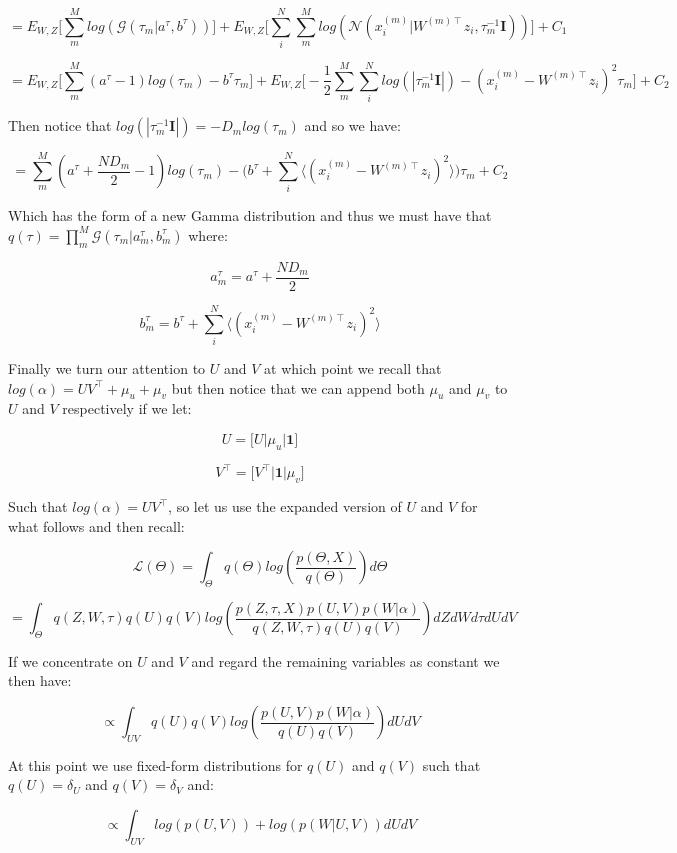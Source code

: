 \documentclass{article}
\begin{document}
$$ = E_{W,Z}\bigg[\sum_m^M{log(\mathcal{G}(\tau_m|a^\tau,b^\tau))}\bigg] +  E_{W,Z}\bigg[\sum_i^N{\sum_m^M{log(\mathcal{N}(x_i^{(m)}|W^{(m)\intercal}z_i, \tau_m^{-1}\textbf{I}))}}\bigg]+C_1$$

$$ = E_{W,Z}\bigg[\sum_m^M{(a^\tau-1)log(\tau_m) - b^\tau\tau_m}\bigg] + E_{W,Z}\bigg[-\frac{1}{2}\sum_m^M{\sum_i^N{log(|\tau_m^{-1}\textbf{I}|) - (x_i^{(m)}-W^{(m)\intercal}z_i)^2\tau_m}}\bigg]+C_2$$

Then notice that $log(|\tau_m^{-1}\textbf{I}|) =  -D_mlog(\tau_m)$ and so we have:

$$ = \sum_m^M{(a^\tau + \frac{ND_m}{2} - 1)log(\tau_m) - \bigg(b^\tau + \sum_i^N{\bigg\langle(x_i^{(m)}-W^{(m)\intercal}z_i)^2\bigg\rangle}\bigg)\tau_m}+C_2$$

Which has the form of a new Gamma distribution and thus we must have that $q(\tau) = \prod_m^M{\mathcal{G}(\tau_m|a_m^\tau,b_m^\tau)}$ where:

$$a_m^\tau = a^\tau + \frac{ND_m}{2}$$

$$b_m^\tau = b^\tau + \sum_i^N{\bigg\langle(x_i^{(m)}-W^{(m)\intercal}z_i)^2\bigg\rangle}$$

Finally we turn our attention to $U$ and $V$ at which point we recall that $log(\alpha) = UV^\intercal + \mu_u + \mu_v$ but then notice that we can append both $\mu_u$ and $\mu_v$ to $U$ and $V$ respectively if we let:

$$U = \bigg[U\bigg|\mu_u\bigg|\textbf{1}\bigg]$$

$$V^\intercal = \bigg[V^\intercal\bigg|\textbf{1}\bigg|\mu_v\bigg]$$

Such that $log(\alpha) = UV^\intercal$, so let us use the expanded version of $U$ and $V$ for what follows and then recall:

$$\mathcal{L}(\Theta) = \int_\Theta{q(\Theta)log(\frac{p(\Theta,X)}{q(\Theta)})d\Theta}$$

$$= \int_\Theta{ q(Z,W,\tau)q(U)q(V)log(\frac{p(Z,\tau,X)p(U,V)p(W|\alpha)}{q(Z,W,\tau)q(U)q(V)})dZdWd\tau dUdV}$$

If we concentrate on $U$ and $V$ and regard the remaining variables as constant we then have:

$$ \propto \int_{UV}{q(U)q(V)log(\frac{p(U,V)p(W|\alpha)}{q(U)q(V)})dUdV}$$

At this point we use fixed-form distributions for $q(U)$ and $q(V)$ such that $q(U)=\delta_U$ and $q(V) = \delta_V$ and:

$$ \propto \int_{UV}{log(p(U,V)) + log(p(W|U,V)) dUdV}$$
\end{document}
